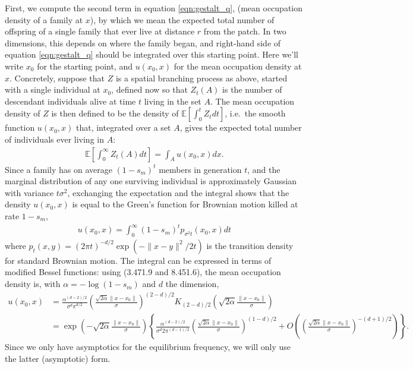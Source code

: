 \documentclass{article}
\newcommand{\E}{\mathbb{E}}
\begin{document}
First, we compute the second term in equation \eqref{eqn:gestalt_q}, (mean occupation density of a family at $x$),
by which we mean the expected total number of offspring of a single family that ever live at distance $r$ from the patch.
In two dimensions, this depends on where the family began, 
and right-hand side of equation \eqref{eqn:gestalt_q} should be integrated over this starting point.
Here we'll write $x_0$ for the starting point, and $u(x_0,x)$ for the mean occupation density at $x$.
Concretely, suppose that $Z$ is a spatial branching process as above, started with a single individual at $x_0$,
defined now so that $Z_t(A)$ is the number of descendant individuals alive at time $t$ living in the set $A$.
The mean occupation density of $Z$ is then defined to be the density of $\E[\int_0^t Z_t dt]$,
i.e.\ the smooth function $u(x_0,x)$ that, integrated over a set $A$, 
gives the expected total number of individuals ever living in $A$:
\begin{align} \label{eqn:occupation_density_defn}
    \E\left[ \int_0^\infty Z_t(A) dt \right] = \int_A u(x_0,x) dx .
\end{align}
Since a family has on average $(1-s_m)^t$ members in generation $t$,
and the marginal distribution of any one surviving individual is approximately Gaussian with variance $t \sigma^2$,
exchanging the expectation and the integral shows that
the density $u(x_0,x)$ is equal to the Green's function for Brownian motion killed at rate $1-s_m$,
\begin{align} \label{eqn:occupation_density_solution}
    u(x_0,x) = \int_0^\infty (1-s_m)^t p_{\sigma^2 t}(x_0,x) dt
\end{align}
where $p_t(x,y) = (2 \pi t)^{-d/2} \exp(-\|x-y\|^2/2t)$ is the transition density for standard Brownian motion.
The integral can be expressed in terms of modified Bessel functions:
using \citet{gradshteyn2007table} (3.471.9 and 8.451.6), the mean occupation density is,
with $\alpha = -\log(1-s_m)$ and $d$ the dimension,
\begin{align}
u(x_0,x) &= \frac{\alpha^{(d-2)/2}}{\sigma^d \pi^{d/2}}\left(\frac{ \sqrt{2 \alpha} \|x-x_0\|}{\sigma} \right)^{(2-d)/2} K_{(2-d)/2}\left( \sqrt{2\alpha} \frac{\|x-x_0\|}{\sigma} \right) \\
         &= 
    \exp\left(- \sqrt{2\alpha} \frac{\|x-x_0\|}{\sigma} \right)
    \left\{
    \frac{\alpha^{(d-2)/2}}{\sigma^d 2 \pi^{(d-1)/2}} \left( \frac{\sqrt{2 \alpha} \|x-x_0\|}{\sigma} \right)^{(1-d)/2} 
+ O\left( \left(\frac{\sqrt{2\alpha}\|x-x_0\|}{\sigma}\right)^{-(d+1)/2} \right) 
    \right\}
    . \label{eqn:occupation_asymptotics}
\end{align}
Since we only have asymptotics for the equilibrium frequency, 
we will only use the latter (asymptotic) form.
\end{document}
